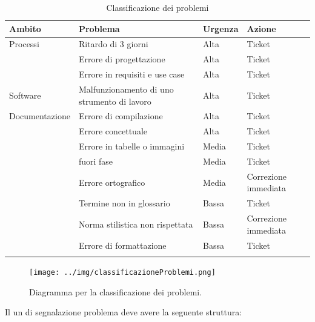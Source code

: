 \documentclass[12pt,a4paper]{article}
\begin{document}
\newpage
\begin{center}
	\begin{longtable}[H]{p{} p{} p{} p{}}
		\toprule
		\textbf{Ambito}	&	\textbf{Problema}	&	\textbf{Urgenza}	&	\textbf{Azione}\\
		\midrule
		\midrule
		Processi & Ritardo di 3 giorni & Alta & Ticket \\*
		\midrule
		& Errore di progettazione & Alta & Ticket \\*
		\midrule
		& Errore in requisiti e use case & Alta & Ticket \\*
		\midrule
		\midrule
		Software & Malfunzionamento di uno strumento di lavoro & Alta & Ticket \\*
		\midrule
		\midrule
		Documentazione & Errore di compilazione & Alta & Ticket \\*
		\midrule
		& Errore concettuale & Alta & Ticket \\*
		\midrule
		& Errore in tabelle o immagini & Media & Ticket \\*
		\midrule
		& \mgls{gulpease} fuori fase & Media & Ticket \\*
		\midrule
		& Errore ortografico & Media & Correzione immediata \\*
		\midrule
		& Termine non in glossario & Bassa & Ticket \\*
		\midrule
		& Norma stilistica non rispettata & Bassa & Correzione immediata \\*
		\midrule
		& Errore di formattazione & Bassa & Ticket \\*
		\bottomrule
		\caption{Classificazione dei problemi}
		\label{tabCalssificazioneProb}
	\end{longtable}
\end{center}

\begin{center}
	\begin{figure}[H]
		\centering
		\label{f1-ClassificazioneProblemi}
		\texttt{[image: ../img/classificazioneProblemi.png]}
		\caption{Diagramma per la classificazione dei problemi.}
	\end{figure}
\end{center}

\label{ticketProblema}
Il un  di segnalazione problema deve avere la seguente struttura:
\end{document}

